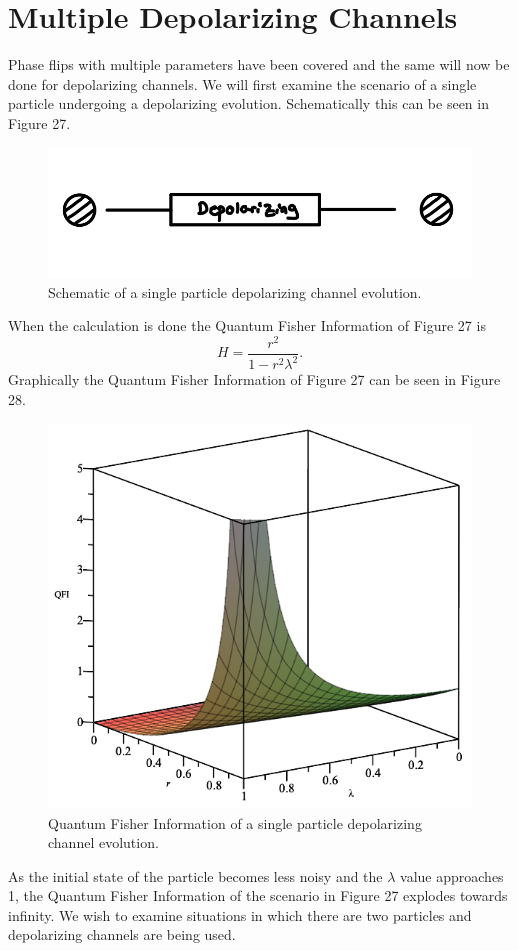 \documentclass[twocolumn]{article}
\begin{document}
\section*{Multiple Depolarizing Channels}
Phase flips with multiple parameters have been covered and the same will now be done for depolarizing channels. We will first examine the scenario of a single particle undergoing a depolarizing evolution. Schematically this can be seen in Figure 27.
\newpage
\begin{figure}[h]
\begin{center}
\includegraphics[width=0.65\linewidth]{Depolarizing-Single-Channel-Lambda-Schematic.jpg}
\caption{Schematic of a single particle depolarizing channel evolution.}
\end{center}
\end{figure}
When the calculation is done the Quantum Fisher Information of Figure 27 is
\begin{equation}\label{eq:106}
H=\frac{r^2}{1-r^2\lambda^2}.
\end{equation}
Graphically the Quantum Fisher Information of Figure 27 can be seen in Figure 28.
\begin{figure}[h]
\begin{center}
\includegraphics[width=0.65\linewidth]{Depolarizing-Single-Channel-QFI.png}
\caption{Quantum Fisher Information of a single particle depolarizing channel evolution.}
\end{center}
\end{figure}
\newline
As the initial state of the particle becomes less noisy and the $\lambda$ value approaches 1, the Quantum Fisher Information of the scenario in Figure 27 explodes towards infinity. We wish to examine situations in which there are two particles and depolarizing channels are being used.
\end{document}
